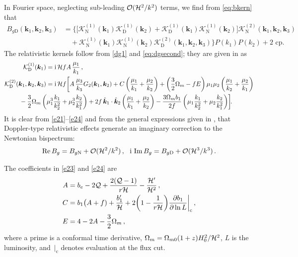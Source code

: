 In Fourier space, 
neglecting sub-leading $ \mathcal{O}(\mathcal{H}^2/k^2)$ terms, we find from \eqref{eq:bkern} that
\begin{align}
 B_{g\mathrm{D}}(\bm{k}_{1},\bm{k}_{2},\bm{k}_{3}) &=  \bigg\{\bigg[\mathcal{K}^{(1)}_{\mathrm{N}}(\bm{k}_{1})\mathcal{K}^{(1)}_{\mathrm{D}}(\bm{k}_{2}) + \mathcal{K}^{(1)}_{\mathrm{D}}(\bm{k}_{1})\mathcal{K}^{(1)}_{\mathrm{N}}(\bm{k}_{2})\bigg]\mathcal{K}^{(2)}_{\mathrm{N}}(\bm{k}_{1},\bm{k}_{2},\bm{k}_{3}) 
\nonumber \\&  \quad 
+\mathcal{K}^{(1)}_{\mathrm{N}}(\bm{k}_{1})\mathcal{K}^{(1)}_{\mathrm{N}}(\bm{k}_{2})\mathcal{K}^{(2)}_{\mathrm{D}}(\bm{k}_{1},\bm{k}_{2},\bm{k}_{3})\bigg\}P(k_{1})P(k_{2})+\text{2 cp}. \label{e21}
\end{align}
The relativistic kernels follow from \eqref{dg1} and \eqref{eq:dgsecond}; they are given in \cite{Clarkson:2018dwn} as
\begin{align}
\mathcal{K}^{(1)}_{\mathrm{D}}(\bm{k}_{1}) &= \mathrm{i}\,\cH f A\,\frac{\mu_{1}}{k_{1}}\,, \label{e23} \\
\mathcal{K}^{(2)}_{\mathrm{D}}(\bm{k}_{1},\bm{k}_{2},\bm{k}_{3}) &= \mathrm{i}\,\cH f \bigg[
A\,\frac{\mu_{3}}{k_{3}}G_{2}(\bm{k}_{1},\bm{k}_{2})
+C\left(\frac{\mu_{1}}{k_{1}} + \frac{\mu_{2}}{k_{2}}\right)
 +\left(\frac{3}{2}\Omega_{m}-fE\right)\mu_{1}\mu_{2}\left(\frac{\mu_{1}}{k_{2}}+\frac{\mu_{2}}{k_{1}}\right)
\nonumber \\
&\hspace*{-1.5cm}  
{} -\frac{3}{2}\Omega_{m}\left(\mu_{1}^{3}\frac{k_{1}}{k_{2}^{2}} + \mu_{2}^{3}\frac{k_{2}}{k_{1}^{2}}\right)
+2f\,  {\hat{\bm{k}}_{1} \cdot \hat{\bm{k}}_2}\left(\frac{\mu_{1}}{k_{1}} + \frac{\mu_{2}}{k_{2}}\right) 
 -\frac{3\Omega_{m}b_1}{2f}\left(\mu_{1}\frac{k_{1}}{k_{2}^{2}} + \mu_{2}\frac{k_{2}}{k_{1}^{2}}\right)\!  \bigg]\! .~~~ \label{e24}
\end{align}
It is clear from \eqref{e21}--\eqref{e24} and from the general expressions given in {\cite{Umeh:2016nuh,Jolicoeur:2017nyt}}, that Doppler-type relativistic effects generate an imaginary correction to the Newtonian bispectrum: 
\begin{equation}
{{\mathrm{Re}}\, B_g =B_{g\mathrm{N}} + \mathcal{O}(\mathcal{H}^2/k^2)\,,~~ {\mathrm{i\,}}\, {\mathrm{Im}}\, B_g = B_{g\mathrm{D}}+ \mathcal{O}(\mathcal{H}^3/k^3)}\,. \label{bgnd}
\end{equation}

The  coefficients in \eqref{e23} and \eqref{e24} are  \cite{Clarkson:2018dwn}
\begin{align}
A &= b_{e} - 2\mathcal{Q} + \frac{2(\mathcal{Q}-1)}{{r} \mathcal{H}}
 - \frac{\mathcal{H}'}{\mathcal{H}^{2}} \label{e25} \,, \\
C &= b_{1}\big(A+f) + \frac{b_1'}{\mathcal{H}} + 2\bigg(1-\frac{1}{{r} \mathcal{H}}\bigg){\frac{\partial b_1}{\partial \ln{L}}\bigg|_{\mathrm{c}}} \label{e26}\,, \\
E &= 4-2A-\frac{3}{2}\Omega_{m} \label{e27} \,,
\end{align}
where a prime is a conformal time derivative, $\Omega_m=\Omega_{m0}(1+z)H_0^2/\mathcal{H}^2$,  $L$ is the  luminosity, and $\,|_{\mathrm{c}}$ denotes evaluation at the flux cut. 

